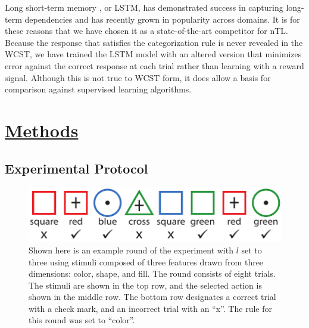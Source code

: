 \documentclass[10pt,letterpaper]{article}
\begin{document}
Long short-term memory \cite{hochreiter_long_1997}, or LSTM, has demonstrated success in capturing long-term dependencies and has recently grown in popularity across domains. It is for these reasons that we have chosen it as a state-of-the-art competitor for nTL. Because the response that satisfies the categorization rule is never revealed in the WCST, we have trained the LSTM model with an altered version that minimizes error against the correct response at each trial rather than learning with a reward signal. Although this is not true to WCST form, it does allow a basis for comparison against supervised learning algorithms.

\section{\underline{Methods}}

\subsection{Experimental Protocol}
\label{sec:exp}

\begin{figure}[!b]
  \centering
  \includegraphics[scale=.55]{images/exp_demo.pdf}
  \caption[]{Shown here is an example round of the experiment with $l$ set to three using stimuli composed of three features drawn from three dimensions: color, shape, and fill. The round consists of eight trials. The stimuli are shown in the top row, and the selected action is shown in the middle row. The bottom row designates a correct trial with a check mark, and an incorrect trial with an ``x''. The rule for this round was set to ``color''.}
  \label{fig:exp_demo}
\end{figure}
\end{document}
